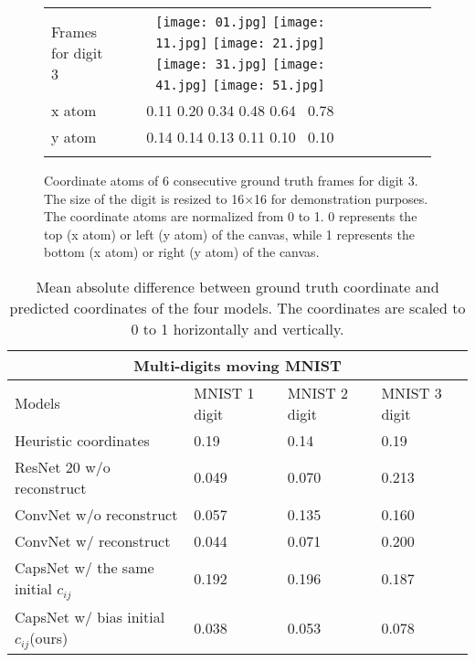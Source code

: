 \documentclass{article}
\begin{document}
\begin{figure}
\begin{tabular}{lcccccc}
Frames for digit 3&
\texttt{[image: 01.jpg]}
\texttt{[image: 11.jpg]}
\texttt{[image: 21.jpg]}
\texttt{[image: 31.jpg]}
\texttt{[image: 41.jpg]}
\texttt{[image: 51.jpg]}
\\
x atom & 
\small{0.11 0.20 0.34 0.48 0.64 \ 0.78} \\
y atom & 
\small{0.14 0.14 0.13 0.11 0.10 \ 0.10} \\
\\
\end{tabular}
    \caption{\label{fig:examples}Coordinate atoms of 6 consecutive ground truth frames for digit 3. The size of the digit is resized to 16$\times$16 for demonstration purposes. The coordinate atoms are normalized from 0 to 1. 0 represents the top (x atom) or left (y atom) of the canvas, while 1 represents the bottom (x atom) or right (y atom) of the canvas.}
\end{figure}

\begin{table*}[t]
 \centering
 \begin{tabular}{ |p{6.5cm}||p{3cm}|p{3cm}|p{3cm}|  }
  \hline
  \multicolumn{4}{|c|}{Multi-digits moving MNIST} \\
  \hline
  Models & MNIST 1 digit & MNIST 2 digit & MNIST 3 digit\\
  \hline
  Heuristic coordinates                  & 0.19  & 0.14  & 0.19 \\
  ResNet 20 w/o reconstruct~\cite{Lin:2018:BDL} & 0.049 & 0.070 & 0.213 \\
  ConvNet w/o reconstruct                & 0.057 & 0.135 & 0.160 \\
  ConvNet w/ reconstruct                 & 0.044 & 0.071 & 0.200 \\
  CapsNet w/ the same initial $c_{ij}$   & 0.192 & 0.196 & 0.187 \\
  \hline
  CapsNet w/ bias initial $c_{ij}$(ours) & 0.038 & 0.053 &  0.078 \\
  \hline
 \end{tabular}
 \caption{Mean absolute difference between ground truth coordinate and predicted coordinates of the four models. The coordinates are scaled to 0 to 1 horizontally and vertically.}
 \label{tab:1}
\end{table*}
\end{document}
